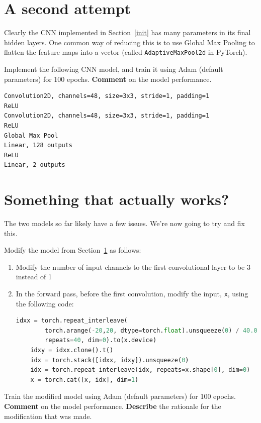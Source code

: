 \documentclass[a4paper]{article}
\begin{document}
\section{A second attempt}\label{second}

Clearly the CNN implemented in Section~\ref{init} has many parameters in its final hidden layers. One common way of reducing this is to use Global Max Pooling to flatten the feature maps into a vector (called \verb|AdaptiveMaxPool2d| in PyTorch).

\begin{tcolorbox}[title=2.1 A simple CNN with global pooling (1 mark)]
Implement the following CNN model, and train it using Adam (default parameters) for 100 epochs. \textbf{Comment} on the model performance.

\begin{lstlisting}
Convolution2D, channels=48, size=3x3, stride=1, padding=1
ReLU
Convolution2D, channels=48, size=3x3, stride=1, padding=1
ReLU
Global Max Pool
Linear, 128 outputs
ReLU
Linear, 2 outputs
\end{lstlisting}
\end{tcolorbox}

\section{Something that actually works?}\label{final}
The two models so far likely have a few issues. We're now going to try and fix this.

\begin{tcolorbox}[title=3.1 Let's regress (2 marks)]
Modify the model from Section~\ref{second} as follows:
\begin{enumerate}
	\item Modify the number of input channels to the first convolutional layer to be 3 instead of 1
	\item In the forward pass, before the first convolution, modify the input, \verb|x|, using the following code:
	\begin{lstlisting}[language=Python]
    idxx = torch.repeat_interleave(
        torch.arange(-20,20, dtype=torch.float).unsqueeze(0) / 40.0, 
        repeats=40, dim=0).to(x.device)
    idxy = idxx.clone().t()
    idx = torch.stack([idxx, idxy]).unsqueeze(0)
    idx = torch.repeat_interleave(idx, repeats=x.shape[0], dim=0)
    x = torch.cat([x, idx], dim=1)
	\end{lstlisting}
\end{enumerate}
Train the modified model using Adam (default parameters) for 100 epochs. \textbf{Comment} on the model performance. \textbf{Describe} the rationale for the modification that was made.
\end{tcolorbox}
\end{document}
